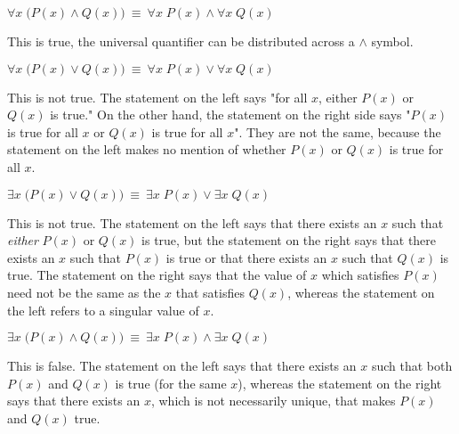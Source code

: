 \documentclass[11pt]{article}
\begin{document}
\begin{Parts}
    \Part $\forall x \; \bigl( P(x) \wedge Q(x) \bigr)~\equiv~\forall x \; P(x) \wedge \forall x \; Q(x)$

    \begin{solution}
        This is true, the universal quantifier can be distributed across a $\land$ symbol.
    \end{solution}  
    
    
    \Part $\forall x \; \bigl( P(x) \vee Q(x) \bigr)~\equiv~\forall x \; P(x) \vee \forall x \; Q(x)$

    \begin{solution}
        This is not true. The statement on the left says "for all $x$, either $P(x)$ or $Q(x)$ is true." On the other hand, the statement on the right side says "$P(x)$ is true for all $x$ or $Q(x)$ is true for all $x$". They are not the same, because the statement on the left makes no mention of whether $P(x)$ or $Q(x)$ is true for all $x$.
    \end{solution}
    
    \Part $\exists x \; \bigl( P(x) \vee Q(x) \bigr)~\equiv~\exists x \; P(x) \vee \exists x \; Q(x)$

    \begin{solution}
        This is not true. The statement on the left says that there exists an $x$ such that \textit{either} $P(x)$ or $Q(x)$ is true, but the statement on the right says that there exists an $x$ such that $P(x)$ is true or that there exists an $x$ such that $Q(x)$ is true. The statement on the right says that the value of $x$ which satisfies $P(x)$ need not be the same as the $x$ that satisfies $Q(x)$, whereas the statement on the left refers to a singular value of $x$.
    \end{solution}
    
    \Part $\exists x \; \bigl( P(x) \wedge Q(x) \bigr)~\equiv~\exists x \; P(x) \wedge \exists x \; Q(x)$

    \begin{solution}
        This is false. The statement on the left says that there exists an $x$ such that both $P(x)$ and $Q(x)$ is true (for the same $x$), whereas the statement on the right says that there exists an $x$, which is not necessarily unique, that makes $P(x)$ and $Q(x)$ true.
    \end{solution}
    
\end{Parts}

\end{document}
